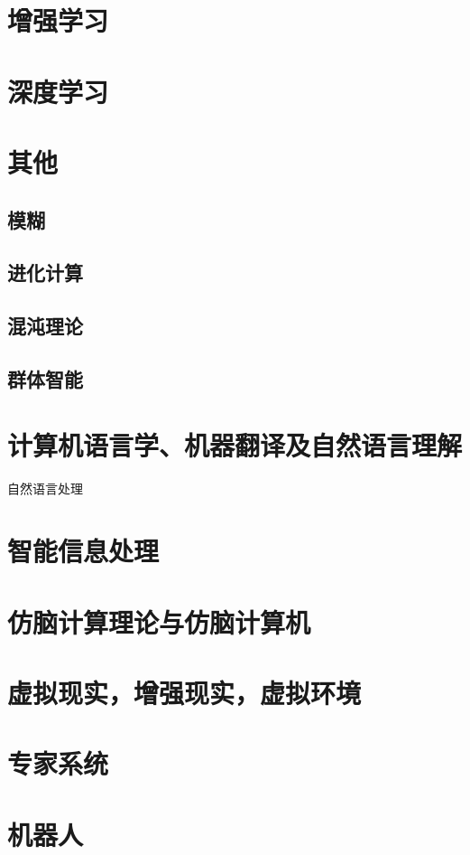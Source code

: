 \documentclass[UTF8]{../computerUniverse}
\begin{document}
\chapter{增强学习}


\chapter{深度学习}



\chapter{其他}

\section{模糊} 
\section{进化计算}
\section{混沌理论}
\section{群体智能}




\chapter{计算机语言学、机器翻译及自然语言理解}
自然语言处理

\chapter{智能信息处理}
\chapter{仿脑计算理论与仿脑计算机}
\chapter{虚拟现实，增强现实，虚拟环境}

\chapter{专家系统}
\chapter{机器人}
\end{document}
